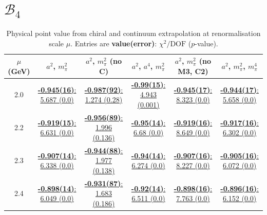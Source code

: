 \documentclass[12pt]{extarticle}
\begin{document}
\section{$\mathcal{B}_4$}
\begin{table}[h!]
\begin{center}
\begin{tabular}{|c|c|c|c|c|c|}
\hline
$\mu$ (GeV) & $a^2$, $m_\pi^2$& $a^2$, $m_\pi^2$ (no C)& $a^2$, $a^4$, $m_\pi^2$& $a^2$, $m_\pi^2$ (no M3, C2)& $a^2$, $m_\pi^2$, $m_\pi^4$\\
\hline
2.0& \hyperlink{SSpPP/NPR/a2m2_20.pdf.1}{\textbf{-0.945(16)}: 5.687 (0.0)} & \hyperlink{SSpPP/NPR/a2m2noC_20.pdf.1}{\textbf{-0.987(92)}: 1.274 (0.28)} & \hyperlink{SSpPP/NPR/a2a4m2_20.pdf.1}{\textbf{-0.99(15)}: 4.943 (0.001)} & \hyperlink{SSpPP/NPR/a2m2mcut_20.pdf.1}{\textbf{-0.945(17)}: 8.323 (0.0)} & \hyperlink{SSpPP/NPR/a2m2m4_20.pdf.1}{\textbf{-0.944(17)}: 5.658 (0.0)}\\
2.2& \hyperlink{SSpPP/NPR/a2m2_22.pdf.1}{\textbf{-0.919(15)}: 6.631 (0.0)} & \hyperlink{SSpPP/NPR/a2m2noC_22.pdf.1}{\textbf{-0.956(89)}: 1.996 (0.136)} & \hyperlink{SSpPP/NPR/a2a4m2_22.pdf.1}{\textbf{-0.95(14)}: 6.68 (0.0)} & \hyperlink{SSpPP/NPR/a2m2mcut_22.pdf.1}{\textbf{-0.919(16)}: 8.649 (0.0)} & \hyperlink{SSpPP/NPR/a2m2m4_22.pdf.1}{\textbf{-0.917(16)}: 6.302 (0.0)}\\
2.3& \hyperlink{SSpPP/NPR/a2m2_23.pdf.1}{\textbf{-0.907(14)}: 6.338 (0.0)} & \hyperlink{SSpPP/NPR/a2m2noC_23.pdf.1}{\textbf{-0.944(88)}: 1.977 (0.138)} & \hyperlink{SSpPP/NPR/a2a4m2_23.pdf.1}{\textbf{-0.94(14)}: 6.274 (0.0)} & \hyperlink{SSpPP/NPR/a2m2mcut_23.pdf.1}{\textbf{-0.907(16)}: 8.227 (0.0)} & \hyperlink{SSpPP/NPR/a2m2m4_23.pdf.1}{\textbf{-0.905(16)}: 6.072 (0.0)}\\
2.4& \hyperlink{SSpPP/NPR/a2m2_24.pdf.1}{\textbf{-0.898(14)}: 6.049 (0.0)} & \hyperlink{SSpPP/NPR/a2m2noC_24.pdf.1}{\textbf{-0.931(87)}: 1.683 (0.186)} & \hyperlink{SSpPP/NPR/a2a4m2_24.pdf.1}{\textbf{-0.92(14)}: 6.511 (0.0)} & \hyperlink{SSpPP/NPR/a2m2mcut_24.pdf.1}{\textbf{-0.898(16)}: 7.763 (0.0)} & \hyperlink{SSpPP/NPR/a2m2m4_24.pdf.1}{\textbf{-0.896(16)}: 6.152 (0.0)}\\
\hline
\end{tabular}
\caption{Physical point value from chiral and continuum extrapolation at renormalisation scale $\mu$. Entries are \textbf{value(error)}: $\chi^2/\text{DOF}$ ($p$-value).}
\end{center}
\end{table}
\end{document}
